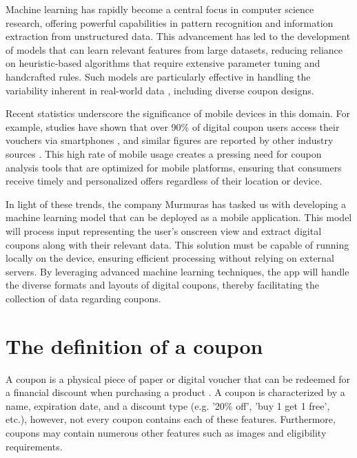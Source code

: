 \documentclass[licencjacka,en]{pracamgr}
\begin{document}
Machine learning has rapidly become a central focus in computer science research, offering powerful capabilities in pattern recognition and information extraction from unstructured data. This advancement has led to the development of models that can learn relevant features from large datasets, reducing reliance on heuristic-based algorithms that require extensive parameter tuning and handcrafted rules. Such models are particularly effective in handling the variability inherent in real-world data \cite{ml_general}, including diverse coupon designs.

Recent statistics underscore the significance of mobile devices in this domain. For example, studies have shown that over 90\% of digital coupon users access their vouchers via smartphones \cite{emarketer_coupon_stats}, and similar figures are reported by other industry sources \cite{voucherify_coupon_stats}. This high rate of mobile usage creates a pressing need for coupon analysis tools that are optimized for mobile platforms, ensuring that consumers receive timely and personalized offers regardless of their location or device.

In light of these trends, the company Murmuras has tasked us with developing a machine learning model that can be deployed as a mobile application. This model will process input representing the user's onscreen view and extract digital coupons along with their relevant data. This solution must be capable of running locally on the device, ensuring efficient processing without relying on external servers. By leveraging advanced machine learning techniques, the app will handle the diverse formats and layouts of digital coupons, thereby facilitating the collection of data regarding coupons.

\section{The definition of a coupon} 
A coupon is a physical piece of paper or digital voucher that can be redeemed for a financial discount when purchasing a product \cite{coupon_definition}. A coupon is characterized by a name, expiration date, and a discount type (e.g. '20\% off', 'buy 1 get 1 free', etc.), however, not every coupon contains each of these features. Furthermore, coupons may contain numerous other features such as images and eligibility requirements. 
\end{document}

